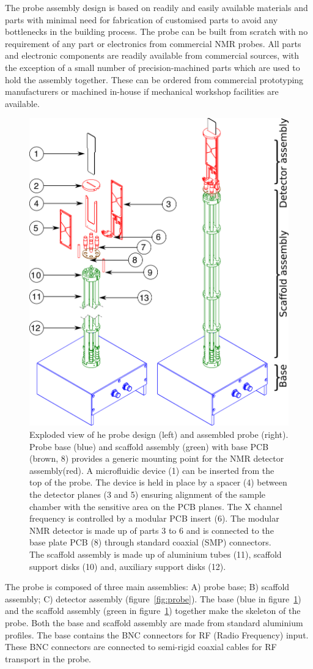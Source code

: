 \documentclass[preprint,12pt]{article}
\begin{document}
The probe assembly design is based on readily and easily available materials and parts 
with minimal need for fabrication of customised parts to avoid any bottlenecks in the 
building process. The probe can be built from scratch with no requirement of any part 
or electronics from commercial NMR probes. 
All parts and electronic components are readily available from commercial sources, 
with the exception of a small number of precision-machined parts which are used 
to hold the assembly together. These can be ordered from commercial prototyping 
manufacturers or machined in-house if mechanical workshop facilities are available.

\begin{figure}
\centering
\includegraphics[width=.5\linewidth,keepaspectratio=true]{./figures/ms5n17-tlp-im-181007-Probe-explode.png} 
\caption{Exploded view of he probe design (left) and assembled probe (right). 
Probe base (blue) and scaffold assembly (green) with base PCB (brown, 8) provides a 
generic mounting point for the NMR detector assembly(red). 
A microfluidic device (1) can be inserted from the top of the probe. 
The device is held in place by a spacer (4) between the detector planes (3 and 5) 
ensuring alignment of the sample chamber with the sensitive area on the PCB planes. 
The X channel frequency is controlled by a 
modular PCB insert (6). The modular NMR detector is made up of parts 3 to 6 and is 
connected to the base plate PCB (8) through standard coaxial (SMP) connectors. 
The scaffold assembly is made up of aluminium tubes (11), scaffold support disks (10) 
and, auxiliary support disks (12).}
\label{fig:probe-explode} 
\end{figure}

The probe is composed of three main assemblies: A) probe base; B) scaffold assembly; 
C) detector assembly (figure~\ref{fig:probe}). 
The  base (blue in figure~\ref{fig:probe-explode}) and the scaffold assembly 
(green in figure~\ref{fig:probe-explode}) together make the skeleton of the probe. 
Both the base and scaffold assembly are made from standard aluminium profiles. 
The base contains the BNC connectors for RF (Radio Frequency) input. 
These BNC connectors are connected to semi-rigid coaxial cables for 
RF transport in the probe.
\end{document}
